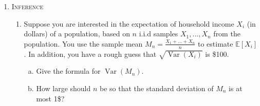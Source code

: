 \documentclass[10pt,letterpaper]{article}
\DeclareMathOperator*{\var}{Var}
\theoremstyle{definition}
\numberwithin{equation}{section}
\begin{document}
\begin{enumerate}[I]
\begin{enumerate}[1)]
\begin{enumerate}[a)]
\item What is E$[X]$? %
\vfill

\pagebreak
\item What is Var$[X]$?%
\vfill

\pagebreak
\end{enumerate}
\item Suppose X and Y are random variables that are jointly distributed 
$$f(x,y)=\begin{cases} \frac{16y}{x^3} \text{, if }x>2, 0<y<1\\ 0, \ \text{ otherwise }\end{cases}$$

\begin{enumerate}[a)]
\item What is the formula for $f(x)$?  What is $f(y)$? 
\vfill

\pagebreak
\item Are X and Y independent? %
\vfill
\item What is E$[Y]$?
\vfill
\item What is E$[Y|X=3]$? %
\vfill
\end{enumerate}

\end{enumerate}


\pagebreak
\item \textsc{Inference} 

\begin{enumerate}[1)]

\item Suppose you are interested in the expectation of household income $X_{i}$ (in dollars) of a population, based on $n$ i.i.d samples $X_{1}, ..., X_{n}$ from the population. You use the sample mean $M_{n} = \frac{X_{1} + ... + X_{n}}{n}$ to estimate $\mathbb{E}[X_{i}]$. In addition, you have a rough guess that $\sqrt{\var(X_{i})}$ is \$100. 

\begin{enumerate}[a)]
	
	\item Give the formula for $\var(M_{n})$.
	\vfill
	
	\item How large should $n$ be so that the standard deviation of $M_{n}$ is at most 1\$?
	\vfill


\end{enumerate}
\end{enumerate}
\end{enumerate}
\end{document}
